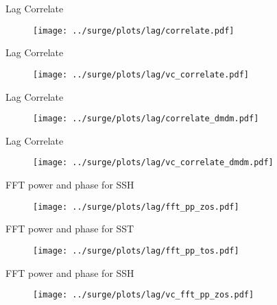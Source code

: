 
\begin{frame}{Lag Correlate}
\vspace{-20pt}
\begin{figure}
\texttt{[image: ../surge/plots/lag/correlate.pdf]}
\caption{}
\end{figure}
\end{frame}


\begin{frame}{Lag Correlate}
\vspace{-20pt}
\begin{figure}
\texttt{[image: ../surge/plots/lag/vc\_correlate.pdf]}
\caption{}
\end{figure}
\end{frame}


\begin{frame}{Lag Correlate}
\vspace{-20pt}
\begin{figure}
\texttt{[image: ../surge/plots/lag/correlate\_dmdm.pdf]}
\caption{}
\end{figure}
\end{frame}


\begin{frame}{Lag Correlate}
\vspace{-20pt}
\begin{figure}
\texttt{[image: ../surge/plots/lag/vc\_correlate\_dmdm.pdf]}
\caption{}
\end{figure}
\end{frame}


\begin{frame}{FFT power and phase for SSH}
\vspace{-20pt}
\begin{figure}
\texttt{[image: ../surge/plots/lag/fft\_pp\_zos.pdf]}
\caption{}
\end{figure}
\end{frame}


\begin{frame}{FFT power and phase for SST}
\vspace{-20pt}
\begin{figure}
\texttt{[image: ../surge/plots/lag/fft\_pp\_tos.pdf]}
\caption{}
\end{figure}
\end{frame}


\begin{frame}{FFT power and phase for SSH}
\vspace{-20pt}
\begin{figure}
\texttt{[image: ../surge/plots/lag/vc\_fft\_pp\_zos.pdf]}
\caption{}
\end{figure}
\end{frame}


